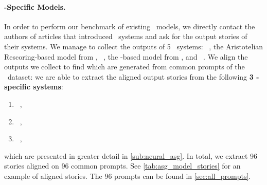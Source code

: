 \paragraph{\asg-Specific Models.}
In order to perform our benchmark of existing \asg\ models, we directly contact the authors of articles that introduced \asg\ systems and ask for the output stories of their systems. We manage to collect the outputs of 5 \asg\ systems: \fusion\ \citep{fan2018hierarchical}, the Aristotelian Rescoring-based model from \citep{goldfarb-tarrant-etal-2020-content}, \hint\ \citep{guan2021long}, the \eop-based model from \citep{bai2021semantics}, and \tdvae\ \citep{wilmot2021temporal}. We align the outputs we collect to find which are generated from common prompts of the \wpfan\ dataset: we are able to extract the aligned output stories from the following \textbf{3 \asg-specific systems}:
\begin{enumerate}[noitemsep]
    \item \fusion\ \citep{fan2018hierarchical},
    \item \hint\ \citep{guan2021long},
    \item \tdvae\ \citep{wilmot2021temporal},
\end{enumerate}
which are presented in greater detail in \autoref{sub:neural_asg}. In total, we extract 96 stories aligned on 96 common prompts. See \autoref{tab:asg_model_stories} for an example of aligned stories. The 96 prompts can be found in \autoref{sec:all_prompts}.

